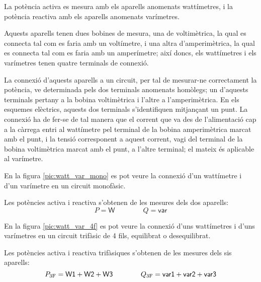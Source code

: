 La potència activa es mesura amb els aparells anomenats wattímetres,
i la potència reactiva amb els aparells anomenats varímetres.

Aquests aparells tenen dues bobines de mesura, una de voltimètrica,
la qual es connecta tal com es faria amb un voltímetre, i una altra
d'amperimètrica, la qual es connecta tal com es faria amb un
amperímetre; així doncs, els wattímetres i els varímetres tenen
quatre terminals de connexió.

La connexió d'aquests aparells a un circuit, per tal de
mesurar-ne correctament la potència, ve determinada pels dos terminals
anomenats homòlegs; un d'aquests terminals pertany a la bobina
voltimètrica i l'altre a l'amperimètrica. En els esquemes elèctrics,
aquests dos terminals s'identifiquen mitjançant un punt. La connexió
ha de fer-se de tal manera que el corrent que va des de
l'alimentació cap a la càrrega entri al wattímetre pel terminal de
la bobina amperimètrica marcat amb el punt, i la tensió corresponent
a aquest corrent, vagi del terminal de la bobina voltimètrica marcat
amb el punt, a l'altre terminal; el mateix és aplicable al
varímetre.

En la figura \vref{pic:watt_var_mono} es pot veure la connexió d'un
wattímetre i d'un varímetre en un circuit monofàsic.


\begin{center}
    
    \label{pic:watt_var_mono}
\end{center}

Les potències activa i reactiva s'obtenen de les mesures dels dos
aparells:
\begin{equation}
    P = \textsf{W} \qquad\qquad Q = \textsf{var}
\end{equation}

En la figura \vref{pic:watt_var_4f} es pot veure la connexió d'uns
wattímetres i d'uns varímetres en un circuit trifàsic de 4 fils,
equilibrat o desequilibrat.

\begin{center}
    
    \label{pic:watt_var_4f}
\end{center}

Les potències activa i reactiva trifàsiques s'obtenen de les mesures
dels sis aparells:
\begin{equation}
    P_\mathrm{3F} = \textsf{W1} +  \textsf{W2} + \textsf{W3}
    \qquad\qquad Q_\mathrm{3F} = \textsf{var1} +  \textsf{var2} + \textsf{var3}
\end{equation}

